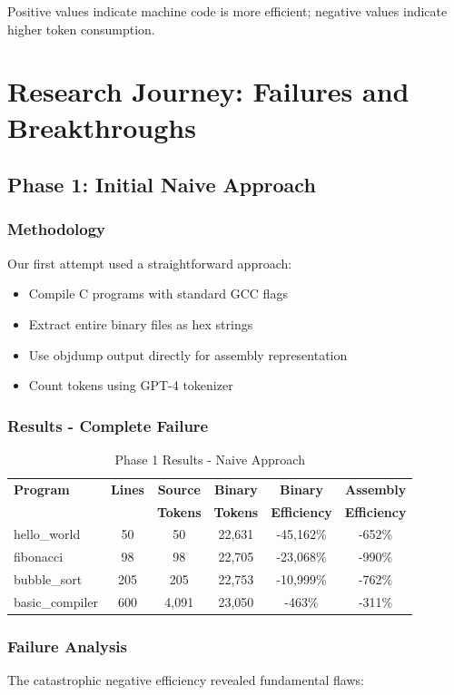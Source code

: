 \documentclass[11pt,a4paper]{article}
\begin{document}
Positive values indicate machine code is more efficient; negative values indicate higher token consumption.

\section{Research Journey: Failures and Breakthroughs}

\subsection{Phase 1: Initial Naive Approach}
\subsubsection{Methodology}
Our first attempt used a straightforward approach:
\begin{itemize}
    \item Compile C programs with standard GCC flags
    \item Extract entire binary files as hex strings
    \item Use objdump output directly for assembly representation
    \item Count tokens using GPT-4 tokenizer
\end{itemize}

\subsubsection{Results - Complete Failure}
\begin{table}[H]
\centering
\caption{Phase 1 Results - Naive Approach}
\begin{tabular}{lccccc}
\toprule
\textbf{Program} & \textbf{Lines} & \textbf{Source} & \textbf{Binary} & \textbf{Binary} & \textbf{Assembly}\\
& & \textbf{Tokens} & \textbf{Tokens} & \textbf{Efficiency} & \textbf{Efficiency}\\
\midrule
hello\_world & 50 & 50 & 22,631 & -45,162\% & -652\%\\
fibonacci & 98 & 98 & 22,705 & -23,068\% & -990\%\\
bubble\_sort & 205 & 205 & 22,753 & -10,999\% & -762\%\\
basic\_compiler & 600 & 4,091 & 23,050 & -463\% & -311\%\\
\bottomrule
\end{tabular}
\end{table}

\subsubsection{Failure Analysis}
The catastrophic negative efficiency revealed fundamental flaws:
\end{document}
